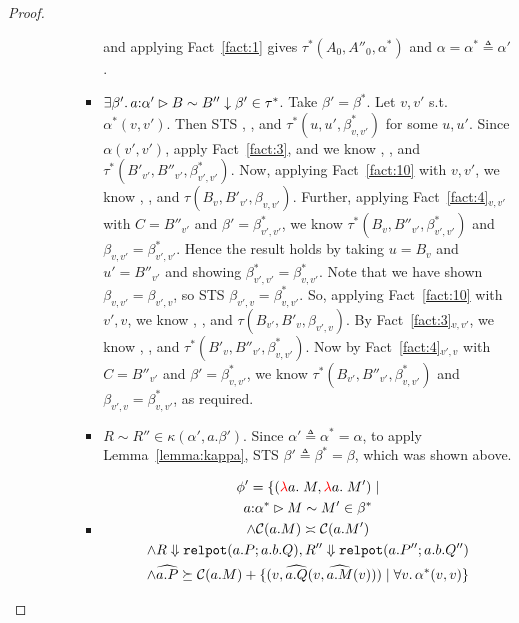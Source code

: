 \begin{proof}
\begin{enumerate}
\begin{itemize}
\begin{enumerate}
\begin{itemize}
          and applying Fact~\ref{fact:1} gives $\tau^*(A_0,A''_0,\alpha^*)$ and $\alpha = \alpha^* \triangleq \alpha'$. 
        \item $\exists \beta'.\, a {:} \alpha' \rhd B \sim B'' \downarrow \beta' \in \tau^*$. Take $\beta' = \beta^*$. Let $v,v'$ s.t. $\alpha^*(v,v')$. Then STS
          , , and $\tau^*(u,u',\beta^*_{v,v'})$ for some $u,u'$. 
          Since $\alpha(v',v')$, apply Fact~\ref{fact:3}, and we know 
          , , and
          $\tau^*(B'_{v'},B''_{v'},\beta^*_{v',v'})$.
          Now, applying Fact~\ref{fact:10} with $v,v'$, we know
          , , and $\tau(B_v,B'_{v'},\beta_{v,v'})$. 
          Further, applying Fact~\ref{fact:4}$_{v,v'}$ with
          $C = B''_{v'}$ and $\beta' = \beta^*_{v',v'}$, 
          we know $\tau^*(B_v,B''_{v'},\beta^*_{v',v'})$ and $\beta_{v,v'} = \beta^*_{v',v'}$.
          Hence the result holds by taking $u = B_v$ and $u' = B''_{v'}$ and showing
          $\beta^*_{v',v'} = \beta^*_{v,v'}$. Note that we have shown $\beta_{v,v'} = \beta_{v',v}$, 
          so STS $\beta_{v',v} = \beta^*_{v,v'}$. 
          So, applying Fact~\ref{fact:10} with $v',v$, we know
          , , and $\tau(B_{v'},B'_{v},\beta_{v',v})$. 
          By Fact~\ref{fact:3}$_{v,v'}$, we know 
          , , and $\tau^*(B'_{v},B''_{v'},\beta^*_{v,v'})$. 
          Now by Fact~\ref{fact:4}$_{v',v}$ with $C =  B''_{v'}$ and $\beta' = \beta^*_{v,v'}$, 
          we know $\tau^*(B_{v'}, B''_{v'}, \beta^*_{v,v'})$ and $\beta_{v',v} = \beta^*_{v,v'}$, as required.
        \item $R \sim R'' \in \kappa(\alpha',a.\beta')$. Since $\alpha' \triangleq \alpha^* = \alpha$, 
          to apply Lemma~\ref{lemma:kappa}, STS $\beta' \triangleq \beta^* = \beta$, which was shown above.
        \item \begin{gather*}
      \phi' = \{(\lam{a}{\_}{M}, \lam{a}{}{M'}) \mid \\
  \sameComp{\isOf{a}{\alpha^*}}{M}{M'}{\beta^*}\\
  \land\fequiv{\cost{a.M}}{\cost{a.M'}}\\
  \land\eval{R}{\relpot{a}{P}{a.b}{Q}}, \eval{R''}{\relpot{a}{P''}{a.b}{Q''}}\\
  \land\widehat{a.P} \succeq \cost{a.M} + \{(v, \widehat{a.Q}(v,\widehat{a.M}(v))) \mid \forall v.\, \alpha^*(v,v)\}\\

\end{gather*}
\end{itemize}
\end{enumerate}
\end{itemize}
\end{enumerate}
\end{proof}
